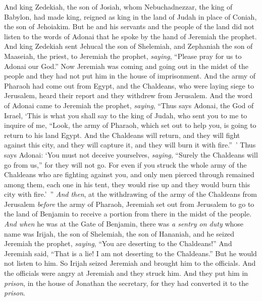 \begin{biblechapter} %
 And king Zedekiah, the son of Josiah, whom Nebuchadnezzar, the king of Babylon, had made king, reigned as king in the land of Judah in place of Coniah, the son of Jehoiakim.
\verse But he and his servants and the people of the land did not listen to the words of Adonai that he spoke by the hand of Jeremiah the prophet.
\verse And king Zedekiah sent Jehucal the son of Shelemiah, and Zephaniah the son of Maaseiah, the priest, to Jeremiah the prophet, \textit{saying}, “Please pray for us to Adonai our God.”
\verse Now Jeremiah was coming and going out in the midst of the people and they had not put him in the house of imprisonment.
\verse And the army of Pharaoh had come out from Egypt, and the Chaldeans, who were laying siege to Jerusalem, heard their report and they withdrew from Jerusalem.
\verse And the word of Adonai came to Jeremiah the prophet, \textit{saying},
\verse “Thus says Adonai, the God of Israel, ‘This is what you shall say to the king of Judah, who sent you to me to inquire of me, “Look, the army of Pharaoh, which set out to help you, is going to return to his land Egypt.
\verse And the Chaldeans will return, and they will fight against this city, and they will capture it, and they will burn it with fire.” ’
\verse Thus says Adonai: ‘You must not deceive yourselves, \textit{saying}, “Surely the Chaldeans will go from us,” for they will not go.
\verse For even if you struck the whole army of the Chaldeans who are fighting against you, and only men pierced through remained among them, each one in his tent, they would rise up and they would burn this city with fire.’ ”
 \textit{And then}, at the withdrawing of the army of the Chaldeans from Jerusalem \textit{before} the army of Pharaoh,
\verse Jeremiah set out from Jerusalem to go to the land of Benjamin to receive a portion from there in the midst of the people.
\verse \textit{And when} he was at the Gate of Benjamin, there was \textit{a sentry on duty} whose name was Irijah, the son of Shelemiah, the son of Hananiah, and he seized Jeremiah the prophet, \textit{saying}, “You are deserting to the Chaldeans!”
\verse And Jeremiah said, “That is a lie! I am not deserting to the Chaldeans.” But he would not listen to him. So Irijah seized Jeremiah and brought him to the officials.
\verse And the officials were angry at Jeremiah and they struck him. And they put him in \textit{prison}, in the house of Jonathan the secretary, for they had converted it to the \textit{prison}.

\end{biblechapter}
